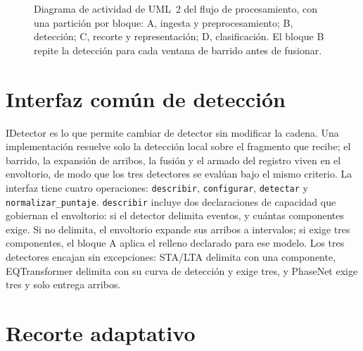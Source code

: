 \documentclass[12pt,oneside,spanish,oldfontcommands]{memoir}
\begin{document}
\begin{figure}[!ht]
\caption{Diagrama de actividad de UML~2 del flujo de procesamiento, con una
partición por bloque: A, ingesta y preprocesamiento; B, detección; C, recorte
y representación; D, clasificación. El bloque B repite la detección para cada
ventana de barrido antes de fusionar.}
\label{fig:flujo}
\end{figure}

\section{Interfaz común de detección}
\label{sec:interfaz-deteccion}

\textsf{IDetector} es lo que permite cambiar de detector sin modificar la
cadena. Una implementación resuelve solo la detección local sobre el
fragmento que recibe; el barrido, la expansión de arribos, la fusión y el
armado del registro viven en el envoltorio, de modo que los tres detectores se
evalúan bajo el mismo criterio. La interfaz tiene cuatro operaciones:
\texttt{describir}, \texttt{configurar}, \texttt{detectar} y
\texttt{normalizar\_puntaje}. \texttt{describir} incluye dos declaraciones de
capacidad que gobiernan el envoltorio: si el detector delimita eventos, y
cuántas componentes exige. Si no delimita, el envoltorio expande sus arribos a
intervalos; si exige tres componentes, el bloque A aplica el relleno
declarado para ese modelo. Los tres detectores encajan sin excepciones:
STA/LTA delimita con una componente, EQTransformer delimita con su curva de
detección y exige tres, y PhaseNet exige tres y solo entrega arribos.

\section{Recorte adaptativo}
\label{sec:recorte-espectrogramas}
\end{document}
